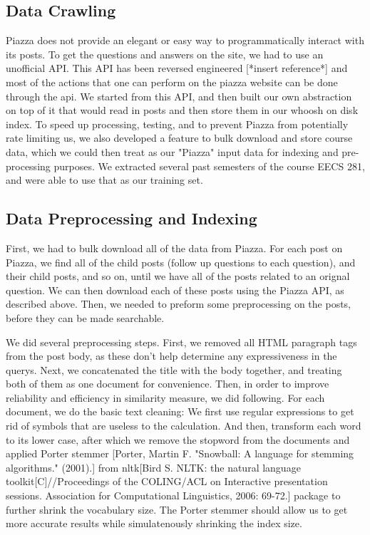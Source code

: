 \documentclass[sigconf]{acmart}
\begin{document}
\subsection{Data Crawling}
Piazza does not provide an elegant or easy way to programmatically interact with its posts. To get the questions and answers on the site, we had to use an unofficial API. This API has been reversed engineered [*insert reference*] and most of the actions that one can perform on the piazza website can be done through the api. We started from this API, and then built our own abstraction on top of it that would read in posts and then store them in our whoosh on disk index. To speed up processing, testing, and to prevent Piazza from potentially rate limiting us, we also developed a feature to bulk download and store course data, which we could then treat as our "Piazza" input data for indexing and pre-processing purposes. We extracted several past semesters of the course EECS 281, and were able to use that as our training set.


\subsection{Data Preprocessing and Indexing}
First, we had to bulk download all of the data from Piazza. For each post on Piazza, we find all of the child posts (follow up questions to each question), and their child posts, and so on, until we have all of the posts related to an orignal question. We can then download each of these posts using the Piazza API, as described above. Then, we needed to preform some preprocessing on the posts, before they can be made searchable.

We did several preprocessing steps. First, we removed all HTML paragraph tags from the post body, as these don't help determine any expressiveness in the querys. Next, we concatenated the title with the body together, and treating both of them as one document for convenience. 
Then, in order to improve reliability and efficiency in similarity measure, we did following. For each document, we do the basic text cleaning: We first use regular expressions to get rid of symbols that are useless to the calculation. And then, transform each word to its lower case, after which we remove the stopword from the documents and applied Porter stemmer [Porter, Martin F. "Snowball: A language for stemming algorithms." (2001).] from nltk[Bird S. NLTK: the natural language toolkit[C]//Proceedings of the COLING/ACL on Interactive presentation sessions. Association for Computational Linguistics, 2006: 69-72.] package to further shrink the vocabulary size. The Porter stemmer should allow us to get more accurate results while simulatenously shrinking the index size.
\end{document}
